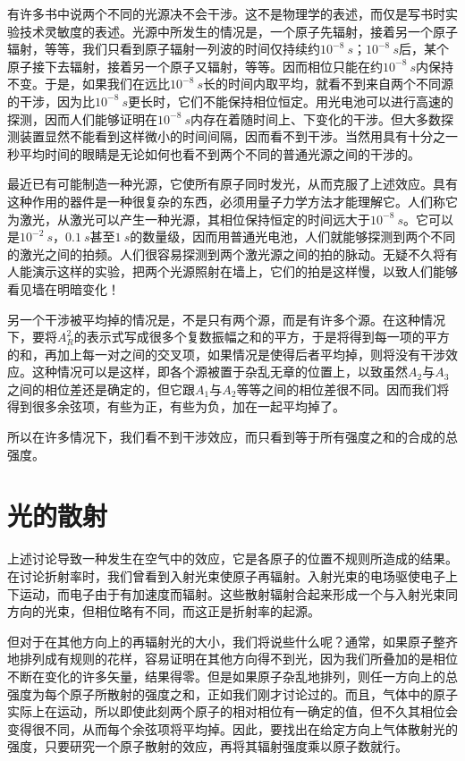 有许多书中说两个不同的光源决不会干涉。这不是物理学的表述，而仅是写书时实验技术灵敏度的表述。光源中所发生的情况是，一个原子先辐射，接着另一个原子辐射，等等，我们只看到原子辐射一列波的时间仅持续约$10^{-8}~s$；$10^{-8}~s$后，某个原子接下去辐射，接着另一个原子又辐射，等等。因而相位只能在约$10^{-8}~s$内保持不变。于是，如果我们在远比$10^{-8}~s$长的时间内取平均，就看不到来自两个不同源的干涉，因为比$10^{-8}~s$更长时，它们不能保持相位恒定。用光电池可以进行高速的探测，因而人们能够证明在$10^{-8}~s$内存在着随时间上、下变化的干涉。但大多数探测装置显然不能看到这样微小的时间间隔，因而看不到干涉。当然用具有十分之一秒平均时间的眼睛是无论如何也看不到两个不同的普通光源之间的干涉的。

最近已有可能制造一种光源，它使所有原子同时发光，从而克服了上述效应。具有这种作用的器件是一种很复杂的东西，必须用量子力学方法才能理解它。人们称它为激光，从激光可以产生一种光源，其相位保持恒定的时间远大于$10^{-8}~s$。它可以是$10^{-2}~s$，$0.1~s$甚至$1~s$的数量级，因而用普通光电池，人们就能够探测到两个不同的激光之间的拍频。人们很容易探测到两个激光源之间的拍的脉动。无疑不久将有人能演示这样的实验，把两个光源照射在墙上，它们的拍是这样慢，以致人们能够看见墙在明暗变化！

另一个干涉被平均掉的情况是，不是只有两个源，而是有许多个源。在这种情况下，要将$A_R^2$的表示式写成很多个复数振幅之和的平方，于是将得到每一项的平方的和，再加上每一对之间的交叉项，如果情况是使得后者平均掉，则将没有干涉效应。这种情况可以是这样，即各个源被置于杂乱无章的位置上，以致虽然$A_2$与$A_3$之间的相位差还是确定的，但它跟$A_1$与$A_2$等等之间的相位差很不同。因而我们将得到很多余弦项，有些为正，有些为负，加在一起平均掉了。

所以在许多情况下，我们看不到干涉效应，而只看到等于所有强度之和的合成的总强度。

\section{光的散射}

上述讨论导致一种发生在空气中的效应，它是各原子的位置不规则所造成的结果。在讨论折射率时，我们曾看到入射光束使原子再辐射。入射光束的电场驱使电子上下运动，而电子由于有加速度而辐射。这些散射辐射合起来形成一个与入射光束同方向的光束，但相位略有不同，而这正是折射率的起源。

但对于在其他方向上的再辐射光的大小，我们将说些什么呢？通常，如果原子整齐地排列成有规则的花样，容易证明在其他方向得不到光，因为我们所叠加的是相位不断在变化的许多矢量，结果得零。但是如果原子杂乱地排列，则任一方向上的总强度为每个原子所散射的强度之和，正如我们刚才讨论过的。而且，气体中的原子实际上在运动，所以即使此刻两个原子的相对相位有一确定的值，但不久其相位会变得很不同，从而每个余弦项将平均掉。因此，要找出在给定方向上气体散射光的强度，只要研究一个原子散射的效应，再将其辐射强度乘以原子数就行。

